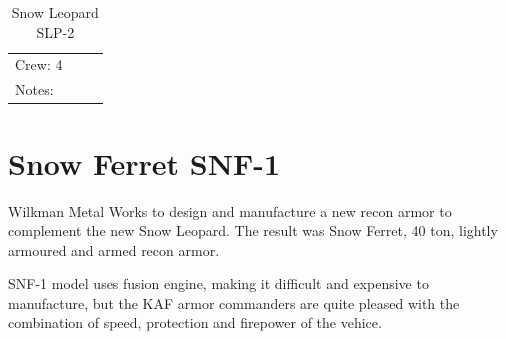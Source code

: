 \documentclass{tufte-book}
\begin{document}
\begin{table}
\begin{minipage}{\textwidth}
\begin{center}
\begin{tabular}{llll}
\multicolumn{3}{l}{Crew: 4} \\

Notes: & & \\


\bottomrule
\end{tabular}
\end{center}
\end{minipage}
\caption{Snow Leopard SLP-2}
\end{table}


\section{Snow Ferret SNF-1}

 Wilkman Metal Works to design and manufacture a
new recon armor to complement the new Snow Leopard. The result was Snow
Ferret, 40 ton, lightly armoured and armed recon armor.

SNF-1 model uses fusion engine, making it difficult and expensive to
manufacture, but the KAF armor commanders are quite pleased with the
combination of speed, protection and firepower of the vehice.
\end{document}
